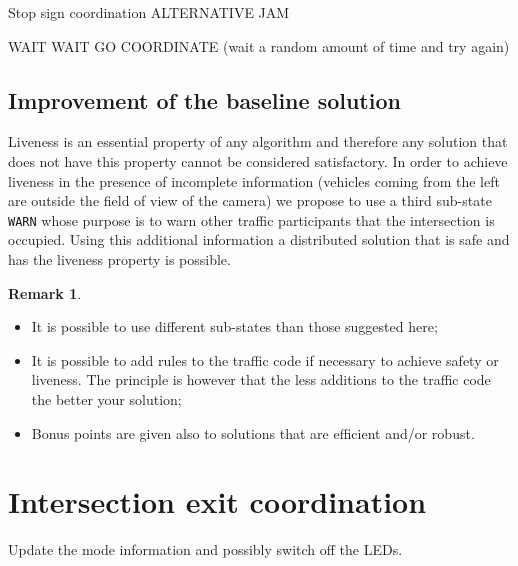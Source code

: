 \documentclass[11pt]{article}
\theoremstyle{definition}
\newtheorem*{rem}{Remark}
\begin{document}
\begin{algorithm}[h!]
\begin{small}
\caption{Stop sign coordination ALTERNATIVE JAM}\label{algo:StopSignCoord2}
\begin{algorithmic}[1]
	\STATE WAIT
		\STATE WAIT
		\STATE GO
	\ELSE
		\STATE COORDINATE (wait a random amount of time and try again)
	\ENDIF
\ENDIF
\ENDIF
\end{algorithmic}
\end{small}
\end{algorithm}

%
%
%
%
%
%
\subsection{Improvement of the baseline solution}
%
Liveness is an essential property of any algorithm and therefore any solution that does not have this property cannot be considered satisfactory. In order to achieve liveness in the presence of incomplete information (vehicles coming from the left are outside the field of view of the camera) we propose to use a third sub-state \texttt{WARN} whose purpose is to warn other traffic participants that the intersection is occupied. Using this additional information a distributed solution that is safe and has the liveness property is possible.
%
\begin{rem}
\begin{itemize}
\item It is possible to use different sub-states than those suggested here;
\item It is possible to add rules to the traffic code if necessary to achieve safety or liveness. The principle is however that the less additions to the traffic code the better your solution;
\item Bonus points are given also to solutions that are efficient and/or robust.
\end{itemize}
\end{rem}
%
%
%
%
%
\section{Intersection exit coordination}\label{sec:IntExit}
%
Update the mode information and possibly switch off the LEDs.
%
%
%
%
%
\end{document}
